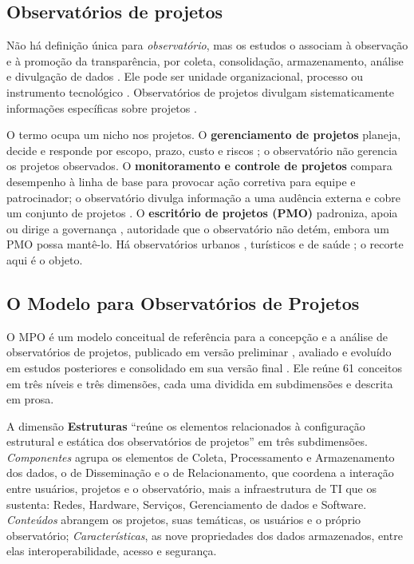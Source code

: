 \subsection{Observatórios de projetos}

Não há definição única para \textit{observatório}, mas os estudos o associam à observação e à promoção da transparência, por coleta, consolidação, armazenamento, análise e divulgação de dados \cite{sakata2013construccao,tinati2015building,keever2017decada}. Ele pode ser unidade organizacional, processo ou instrumento tecnológico \cite{vieira2020universal}. Observatórios de projetos divulgam sistematicamente informações específicas sobre projetos \cite{vieira2021model}.

O termo ocupa um nicho nos projetos. O \textbf{gerenciamento de projetos} planeja, decide e responde por escopo, prazo, custo e riscos \cite{pmi2021pmbok,turner2016gower}; o observatório não gerencia os projetos observados. O \textbf{monitoramento e controle de projetos} compara desempenho à linha de base para provocar ação corretiva para equipe e patrocinador; o observatório divulga informação a uma audência externa e cobre um conjunto de projetos \cite{trois2017transparency}. O \textbf{escritório de projetos (PMO)} padroniza, apoia ou dirige a governança \cite{pmi2021pmbok}, autoridade que o observatório não detém, embora um PMO possa mantê-lo. Há observatórios urbanos \cite{keever2017decada}, turísticos \cite{pimentel2018observatorio} e de saúde \cite{yoshiura2018towards}; o recorte aqui é o objeto.

\subsection{O Modelo para Observatórios de Projetos}

O MPO é um modelo conceitual de referência para a concepção e a análise de observatórios de projetos, publicado em versão preliminar \cite{vieira2021model}, avaliado e evoluído em estudos posteriores \cite{vieira2022evaluating,vieira2023survey} e consolidado em sua versão final \cite{farias2025conceptual}. Ele reúne 61 conceitos em três níveis e três dimensões, cada uma dividida em subdimensões e descrita em prosa.

A dimensão \textbf{Estruturas} ``reúne os elementos relacionados à configuração estrutural e estática dos observatórios de projetos'' em três subdimensões. \textit{Componentes} agrupa os elementos de Coleta, Processamento e Armazenamento dos dados, o de Disseminação e o de Relacionamento, que coordena a interação entre usuários, projetos e o observatório, mais a infraestrutura de TI que os sustenta: Redes, Hardware, Serviços, Gerenciamento de dados e Software. \textit{Conteúdos} abrangem os projetos, suas temáticas, os usuários e o próprio observatório; \textit{Características}, as nove propriedades dos dados armazenados, entre elas interoperabilidade, acesso e segurança.

